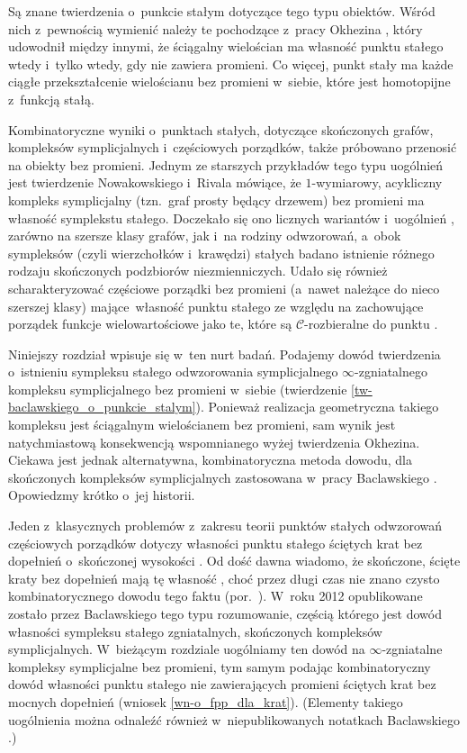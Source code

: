 Są znane twierdzenia o~punkcie stałym dotyczące tego typu obiektów. Wśród nich z~pewnością wymienić należy te pochodzące z~pracy Okhezina \cite{Okhezin95}, który udowodnił między innymi, że ściągalny wielościan ma własność punktu stałego wtedy i~tylko wtedy, gdy nie zawiera promieni. Co więcej, punkt stały ma każde ciągłe przekształcenie wielościanu bez promieni w~siebie, które jest homotopijne z~funkcją stałą.

Kombinatoryczne wyniki o~punktach stałych, dotyczące skończonych grafów, kompleksów symplicjalnych i~częściowych porządków, także próbowano przenosić na obiekty bez promieni. Jednym ze starszych przykładów tego typu uogólnień jest twierdzenie Nowakowskiego i~Rivala \cite{Nowakowski79} mówiące, że $1$-wymiarowy, acykliczny kompleks symplicjalny (tzn.~graf prosty będący drzewem) bez promieni ma własność symplekstu stałego. Doczekało się ono licznych wariantów i~uogólnień \cite{Espinola06,Halin98,Polat93,Polat95,Polat96,Polat98,Polat04,Polat09,Polat12,Polat94,Schmidt83}, zarówno na szersze klasy grafów, jak i~na rodziny odwzorowań, a~obok sympleksów (czyli wierzchołków i~krawędzi) stałych badano istnienie różnego rodzaju skończonych podzbiorów niezmienniczych. Udało się również scharakteryzować częściowe porządki bez promieni (a~nawet należące do nieco szerszej klasy) mające~własność punktu stałego ze względu na zachowujące porządek funkcje wielowartościowe jako te, które są $\mathcal{C}$-rozbieralne do punktu \cite[Theorem 3.27]{Schroder99}.

Niniejszy rozdział wpisuje się w~ten nurt badań. Podajemy dowód twierdzenia o~istnieniu sympleksu stałego odwzorowania symplicjalnego $\infty$-zgniatalnego kompleksu symplicjalnego bez promieni w~siebie (twierdzenie \ref{tw-baclawskiego_o_punkcie_stalym}). Ponieważ realizacja geometryczna takiego kompleksu jest ściągalnym wielościanem bez promieni, sam wynik jest natychmiastową konsekwencją wspomnianego wyżej twierdzenia Okhezina. Ciekawa jest jednak alternatywna, kombinatoryczna metoda dowodu, dla skończonych kompleksów symplicjalnych zastosowana w~pracy Baclawskiego \cite{Baclawski12}. Opowiedzmy krótko o~jej historii.

Jeden z~klasycznych problemów z~zakresu teorii punktów stałych odwzorowań częściowych porządków dotyczy własności punktu stałego ściętych krat bez dopełnień o~skończonej wysokości \cite[s.~98]{Bjorner81}. Od dość dawna wiadomo, że skończone, ścięte kraty bez dopełnień mają tę własność \cite{Baclawski79}, choć przez długi czas nie znano czysto kombinatorycznego dowodu tego faktu (por.~\cite[s.~838]{Rival82}). W~roku 2012 opublikowane zostało przez Baclawskiego \cite{Baclawski12} tego typu rozumowanie, częścią którego jest dowód własności sympleksu stałego zgniatalnych, skończonych kompleksów symplicjalnych. W~bieżącym rozdziale uogólniamy ten dowód na $\infty$-zgniatalne kompleksy symplicjalne bez promieni, tym samym podając kombinatoryczny dowód własności punktu stałego nie zawierających promieni ściętych krat bez mocnych dopełnień (wniosek \ref{wn-o_fpp_dla_krat}). (Elementy takiego uogólnienia można odnaleźć również w~niepublikowanych notatkach Baclawskiego \cite{Baclawski}.)

